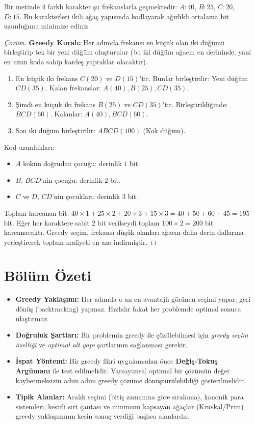 \begin{example}
Bir metinde 4 farklı karakter şu frekanslarla geçmektedir: $A: 40$, $B: 25$, $C: 20$, $D: 15$. Bu karakterleri ikili ağaç yapısında kodlayarak ağırlıklı ortalama bit uzunluğunu minimize ediniz.
\end{example}

\begin{proof}[Çözüm]
\textbf{Greedy Kuralı:} Her adımda frekansı en küçük olan iki düğümü birleştirip tek bir yeni düğüm oluşturulur (bu iki düğüm ağacın en derininde, yani en uzun koda sahip kardeş yapraklar olacaktır).
\begin{enumerate}
    \item En küçük iki frekans $C(20)$ ve $D(15)$'tir. Bunlar birleştirilir: Yeni düğüm $CD(35)$. Kalan frekanslar: $A(40), B(25), CD(35)$.
    \item Şimdi en küçük iki frekans $B(25)$ ve $CD(35)$'tir. Birleştirildiğinde: $BCD(60)$. Kalanlar: $A(40), BCD(60)$.
    \item Son iki düğüm birleştirilir: $ABCD(100)$ (Kök düğüm).
\end{enumerate}
Kod uzunlukları:
\begin{itemize}
    \item $A$ kökün doğrudan çocuğu: derinlik $1$ bit.
    \item $B$, $BCD$'nin çocuğu: derinlik $2$ bit.
    \item $C$ ve $D$, $CD$'nin çocukları: derinlik $3$ bit.
\end{itemize}
Toplam harcanan bit: $40 \times 1 + 25 \times 2 + 20 \times 3 + 15 \times 3 = 40 + 50 + 60 + 45 = 195$ bit.
Eğer her karaktere sabit 2 bit verilseydi toplam $100 \times 2 = 200$ bit harcanacaktı. Greedy seçim, frekansı düşük olanları ağacın daha derin dallarına yerleştirerek toplam maliyeti en aza indirmiştir.
\end{proof}

\section*{Bölüm Özeti}
\begin{itemize}
    \item \textbf{Greedy Yaklaşımı:} Her adımda o an en avantajlı görünen seçimi yapar; geri dönüş (backtracking) yapmaz. Hızlıdır fakat her problemde optimal sonuca ulaştırmaz.
    \item \textbf{Doğruluk Şartları:} Bir problemin greedy ile çözülebilmesi için \textit{greedy seçim özelliği} ve \textit{optimal alt yapı} şartlarının sağlanması gerekir.
    \item \textbf{İspat Yöntemi:} Bir greedy fikri uygulamadan önce \textbf{Değiş-Tokuş Argümanı} ile test edilmelidir. Varsayımsal optimal bir çözümün değer kaybetmeksizin adım adım greedy çözüme dönüştürülebildiği gösterilmelidir.
    \item \textbf{Tipik Alanlar:} Aralık seçimi (bitiş zamanına göre sıralama), kanonik para sistemleri, kesirli sırt çantası ve minimum kapsayan ağaçlar (Kruskal/Prim) greedy yaklaşımının kesin sonuç verdiği başlıca alanlardır.
\end{itemize}
